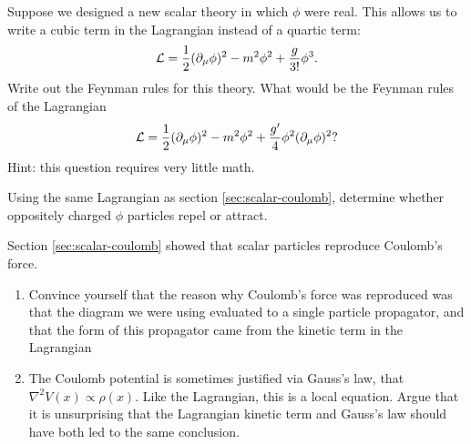 \begin{problem}
\end{problem}

\begin{problem}
  Suppose we designed a new scalar theory in which $\phi$ were real. This allows us to write a cubic term in the Lagrangian instead of a quartic term:
  $$\mathcal{L} = \frac{1}{2}(\partial_\mu \phi)^2 - m^2 \phi^2 + \frac{g}{3!}\phi^3.$$
  Write out the Feynman rules for this theory. What would be the Feynman rules of the Lagrangian
  $$\mathcal{L} = \frac{1}{2}(\partial_\mu \phi)^2 - m^2 \phi^2 + \frac{g'}{4}\phi^2(\partial_\mu \phi)^2?$$
  Hint: this question requires very little math.
\end{problem}

\begin{problem}
  Using the same Lagrangian as section \ref{sec:scalar-coulomb}, determine whether oppositely charged $\phi$ particles repel or attract.
\end{problem}

\begin{problem}
  Section \ref{sec:scalar-coulomb} showed that scalar particles reproduce Coulomb's force.
  \begin{enumerate}
    \item Convince yourself that the reason why Coulomb's force was reproduced was that the diagram we were using evaluated to a single particle propagator, and that the form of this propagator came from the kinetic term in the Lagrangian
    \item The Coulomb potential is sometimes justified via Gauss's law, that $\nabla^2 V(x) \propto \rho(x)$. Like the Lagrangian, this is a local equation. Argue that it is unsurprising that the Lagrangian kinetic term and Gauss's law should have both led to the same conclusion.
  \end{enumerate}
\end{problem}